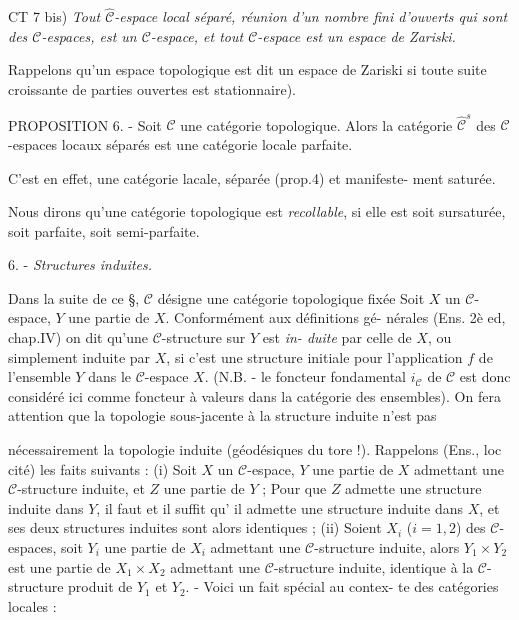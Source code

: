 CT 7 bis) \emph{Tout $\hat{\mathcal{C}}$-espace local séparé, réunion d'un nombre fini d'ouverts
qui sont des $\mathcal{C}$-espaces, est un $\mathcal{C}$-espace, et tout $\mathcal{C}$-espace
est un espace de Zariski.}

Rappelons qu'un espace topologique est dit un espace de Zariski si
toute suite croissante de parties ouvertes est stationnaire).

PROPOSITION 6. - Soit $\mathcal{C}$ une catégorie topologique. Alors la catégorie
$\hat{\mathcal{C}}^s$ des $\mathcal{C}$-espaces locaux séparés est une catégorie locale parfaite.

C'est en effet, une catégorie lacale, séparée (prop.4) et manifeste-
ment saturée.

Nous dirons qu'une catégorie topologique est \emph{recollable}, si elle est
soit sursaturée, soit parfaite, soit semi-parfaite.

6. - \emph{Structures induites.}

Dans la suite de ce \S , $\mathcal{C}$ désigne une catégorie topologique fixée
Soit $X$ un $\mathcal{C}$-espace, $Y$ une partie de $X$. Conformément aux définitions gé-
nérales (Ens. 2è ed, chap.IV) on dit qu'une $\mathcal{C}$-structure sur $Y$ est \emph{in-
duite} par celle de $X$, ou simplement induite par $X$, si c'est une structure
initiale pour l'application $f$ de l'ensemble $Y$ dans le $\mathcal{C}$-espace $X$.
(N.B. - le foncteur fondamental $i_{\mathcal{C}}$ de $\mathcal{C}$ est donc considéré ici comme
foncteur à valeurs dans la catégorie des ensembles). On fera attention
que la topologie sous-jacente à la structure induite n'est pas

\newpage



nécessairement la topologie induite (géodésiques du tore !). Rappelons
(Ens., loc cité) les faits suivants : (i) Soit $X$ un $\mathcal{C}$-espace, $Y$ une
partie de $X$ admettant une $\mathcal{C}$-structure induite, et $Z$ une partie de $Y$ ;
Pour que $Z$ admette une structure induite dans $Y$, il faut et il suffit qu'
il admette une structure induite dans $X$, et ses deux structures induites
sont alors identiques ; (ii) Soient $X_i$ ($i=1,2$) des $\mathcal{C}$-espaces, soit $Y_i$
une partie de $X_i$ admettant une $\mathcal{C}$-structure induite, alors $Y_1 \times Y_2$
est une partie de $X_1 \times X_2$ admettant une $\mathcal{C}$-structure induite, identique
à la $\mathcal{C}$-structure produit de $Y_1$ et $Y_2$. - Voici un fait spécial au contex-
te des catégories locales :

